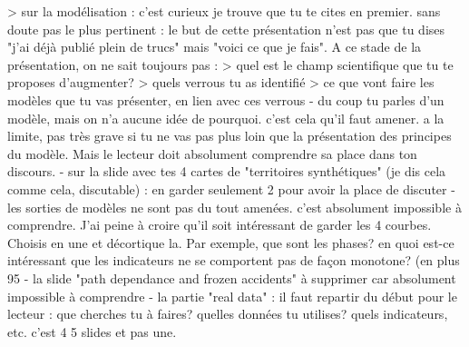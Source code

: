 \documentclass[11pt]{article}
\begin{document}
> sur la modélisation : c'est curieux je trouve que tu te cites en premier. sans doute pas le plus pertinent : le but de cette présentation n'est pas que tu dises "j'ai déjà publié plein de trucs" mais "voici ce que je fais".
A ce stade de la présentation, on ne sait toujours pas : 
> quel est le champ scientifique que tu te proposes d'augmenter?
> quels verrous tu as identifié
> ce que vont faire les modèles que tu vas présenter, en lien avec ces verrous
- du coup tu parles d'un modèle, mais on n'a aucune idée de pourquoi. c'est cela qu'il faut amener. a la limite, pas très grave si tu ne vas pas plus loin que la présentation des principes du modèle. Mais le lecteur doit absolument comprendre sa place dans ton discours.
- sur la slide avec tes 4 cartes de "territoires synthétiques" (je dis cela comme cela, discutable) : en garder seulement 2 pour avoir la place de discuter
- les sorties de modèles ne sont pas du tout amenées. c'est absolument impossible à comprendre. J'ai peine à croire qu'il soit intéressant de garder les 4 courbes. Choisis en une et décortique la. Par exemple, que sont les phases? en quoi est-ce intéressant que les indicateurs ne se comportent pas de façon monotone? (en plus 95%
- la slide "path dependance and frozen accidents" à supprimer car absolument impossible à comprendre
- la partie "real data" : il faut repartir du début pour le lecteur : que cherches tu à faires? quelles données tu utilises? quels indicateurs, etc. c'est 4 5 slides et pas une.
\end{document}
